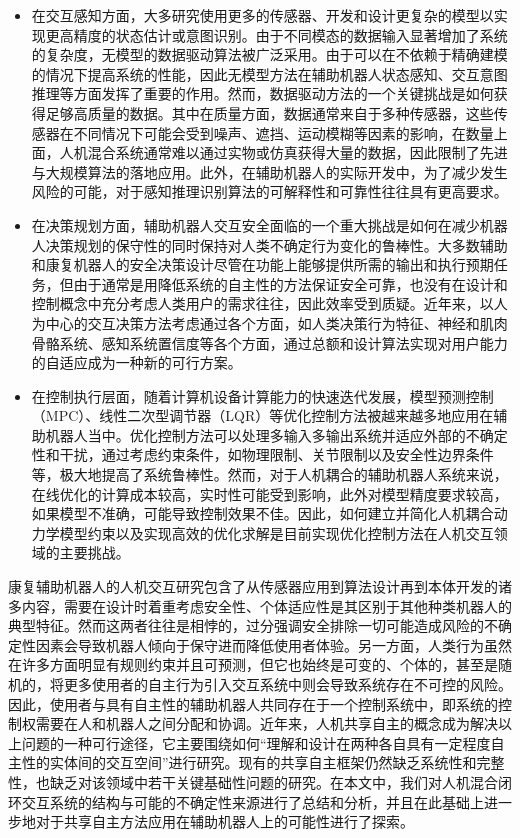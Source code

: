 \begin{itemize}
\item 在交互感知方面，大多研究使用更多的传感器、开发和设计更复杂的模型以实现更高精度的状态估计或意图识别。由于不同模态的数据输入显著增加了系统的复杂度，无模型的数据驱动算法被广泛采用。由于可以在不依赖于精确建模的情况下提高系统的性能，因此无模型方法在辅助机器人状态感知、交互意图推理等方面发挥了重要的作用。然而，数据驱动方法的一个关键挑战是如何获得足够高质量的数据。其中在质量方面，数据通常来自于多种传感器，这些传感器在不同情况下可能会受到噪声、遮挡、运动模糊等因素的影响，在数量上面，人机混合系统通常难以通过实物或仿真获得大量的数据，因此限制了先进与大规模算法的落地应用。此外，在辅助机器人的实际开发中，为了减少发生风险的可能，对于感知推理识别算法的可解释性和可靠性往往具有更高要求。

\item 在决策规划方面，辅助机器人交互安全面临的一个重大挑战是如何在减少机器人决策规划的保守性的同时保持对人类不确定行为变化的鲁棒性。大多数辅助和康复机器人的安全决策设计尽管在功能上能够提供所需的输出和执行预期任务，但由于通常是用降低系统的自主性的方法保证安全可靠，也没有在设计和控制概念中充分考虑人类用户的需求往往，因此效率受到质疑。近年来，以人为中心的交互决策方法考虑通过各个方面，如人类决策行为特征、神经和肌肉骨骼系统、感知系统置信度等各个方面，通过总额和设计算法实现对用户能力的自适应成为一种新的可行方案。

\item 在控制执行层面，随着计算机设备计算能力的快速迭代发展，模型预测控制（MPC）、线性二次型调节器（LQR）等优化控制方法被越来越多地应用在辅助机器人当中。优化控制方法可以处理多输入多输出系统并适应外部的不确定性和干扰，通过考虑约束条件，如物理限制、关节限制以及安全性边界条件等，极大地提高了系统鲁棒性。然而，对于人机耦合的辅助机器人系统来说，在线优化的计算成本较高，实时性可能受到影响，此外对模型精度要求较高，如果模型不准确，可能导致控制效果不佳。因此，如何建立并简化人机耦合动力学模型约束以及实现高效的优化求解是目前实现优化控制方法在人机交互领域的主要挑战。
\end{itemize}

康复辅助机器人的人机交互研究包含了从传感器应用到算法设计再到本体开发的诸多内容，需要在设计时着重考虑安全性、个体适应性是其区别于其他种类机器人的典型特征。然而这两者往往是相悖的，过分强调安全排除一切可能造成风险的不确定性因素会导致机器人倾向于保守进而降低使用者体验。另一方面，人类行为虽然在许多方面明显有规则约束并且可预测，但它也始终是可变的、个体的，甚至是随机的，将更多使用者的自主行为引入交互系统中则会导致系统存在不可控的风险。因此，使用者与具有自主性的辅助机器人共同存在于一个控制系统中，即系统的控制权需要在人和机器人之间分配和协调\cite{ZhaoQianTanKongZhiZhongDeGongXiangXinXiHeGongXiangZiZhu2021}。近年来，人机共享自主的概念成为解决以上问题的一种可行途径，它主要围绕如何``理解和设计在两种各自具有一定程度自主性的实体间的交互空间''进行研究\cite{abbassTrustedAutonomyCognitive2016}。现有的共享自主框架仍然缺乏系统性和完整性，也缺乏对该领域中若干关键基础性问题的研究。在本文中，我们对人机混合闭环交互系统的结构与可能的不确定性来源进行了总结和分析，并且在此基础上进一步地对于共享自主方法应用在辅助机器人上的可能性进行了探索。

